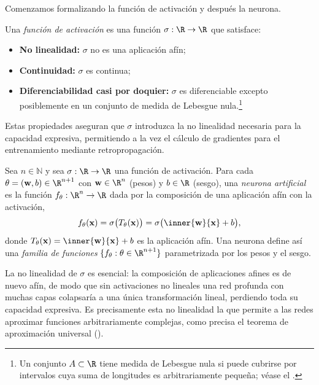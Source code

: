 Comenzamos formalizando la funci\'on de activaci\'on y despu\'es la neurona.

\begin{definition}
\label{def:found:activation}
Una \emph{funci\'on de activaci\'on} es una funci\'on $\sigma : \R \to \R$ que
satisface:
\begin{itemize}
  \item \textbf{No linealidad:} $\sigma$ no es una aplicaci\'on af\'in;
  \item \textbf{Continuidad:} $\sigma$ es continua;
  \item \textbf{Diferenciabilidad casi por doquier:} $\sigma$ es diferenciable
    excepto posiblemente en un conjunto de medida de Lebesgue
    nula.\footnote{Un conjunto $A \subset \R$ tiene medida de Lebesgue nula si
    puede cubrirse por intervalos cuya suma de longitudes es arbitrariamente
    peque\~na; v\'ease el .}
\end{itemize}
\end{definition}

Estas propiedades aseguran que $\sigma$ introduzca la no linealidad necesaria para
la capacidad expresiva, permitiendo a la vez el c\'alculo de gradientes para el
entrenamiento mediante retropropagaci\'on.

\begin{definition}
\label{def:found:neuron}
Sea $n \in \mathbb{N}$ y sea $\sigma : \R \to \R$ una funci\'on de activaci\'on.
Para cada $\theta = (\mathbf{w}, b) \in \R^{n+1}$ con $\mathbf{w} \in \R^n$
(pesos) y $b \in \R$ (sesgo), una \emph{neurona artificial} es la funci\'on
$f_\theta : \R^n \to \R$ dada por la composici\'on de una aplicaci\'on af\'in con
la activaci\'on,
\[
  f_\theta(\mathbf{x}) = \sigma\bigl(T_\theta(\mathbf{x})\bigr)
  = \sigma\bigl(\inner{\mathbf{w}}{\mathbf{x}} + b\bigr),
\]
donde $T_\theta(\mathbf{x}) = \inner{\mathbf{w}}{\mathbf{x}} + b$ es la
aplicaci\'on af\'in. Una neurona define as\'i una \emph{familia de funciones}
$\{f_\theta : \theta \in \R^{n+1}\}$ parametrizada por los pesos y el sesgo.
\end{definition}

La no linealidad de $\sigma$ es esencial: la composici\'on de aplicaciones afines
es de nuevo af\'in, de modo que sin activaciones no lineales una red profunda con
muchas capas colapsar\'ia a una \'unica transformaci\'on lineal, perdiendo toda su
capacidad expresiva. Es precisamente esta no linealidad la que permite a las redes
aproximar funciones arbitrariamente complejas, como precisa el teorema de
aproximaci\'on universal ().

